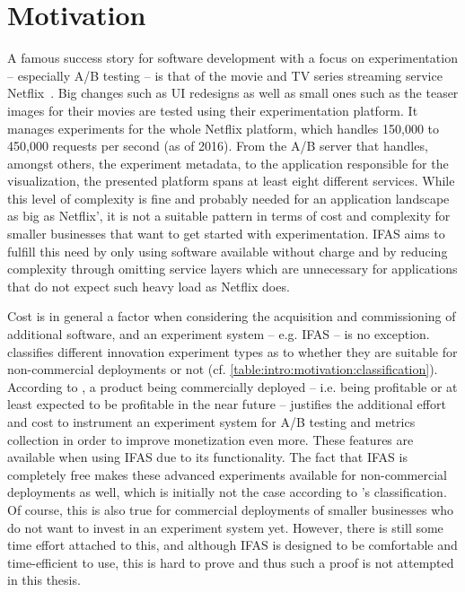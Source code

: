 
\section{Motivation}
\label{sec:intro:motivation}

A famous success story for software development with a focus on experimentation -- especially A/B testing -- is that of the movie and TV series streaming service Netflix~\cite{WEB:Netflix:2016}.
Big changes such as UI redesigns as well as small ones such as the teaser images for their movies are tested using their experimentation platform.
It manages experiments for the whole Netflix platform, which handles 150,000 to 450,000 requests per second (as of 2016).
From the A/B server that handles, amongst others, the experiment metadata, to the application responsible for the visualization, the presented platform spans at least eight different services.
While this level of complexity is fine and probably needed for an application landscape as big as Netflix', it is not a suitable pattern in terms of cost and complexity for smaller businesses that want to get started with experimentation.
\ac{IFAS} aims to fulfill this need by only using software available without charge and by reducing complexity through omitting service layers which are unnecessary for applications that do not expect such heavy load as Netflix does.

Cost is in general a factor when considering the acquisition and commissioning of additional software, and an experiment system -- e.g. \ac{IFAS} -- is no exception.
\citet{Bosch2012} classifies different innovation experiment types as to whether they are suitable for non-commercial deployments or not (cf. \cref{table:intro:motivation:classification}).
According to \citeauthor{Bosch2012}, a product being commercially deployed -- i.e. being profitable or at least expected to be profitable in the near future -- justifies the additional effort and cost to instrument an experiment system for A/B testing and metrics collection in order to improve monetization even more.
These features are available when using \ac{IFAS} due to its functionality.
The fact that \ac{IFAS} is completely free makes these advanced experiments available for non-commercial deployments as well, which is initially not the case according to \citeauthor{Bosch2012}'s classification.
Of course, this is also true for commercial deployments of smaller businesses who do not want to invest in an experiment system yet.
However, there is still some time effort attached to this, and although \ac{IFAS} is designed to be comfortable and time-efficient to use, this is hard to prove and thus such a proof is not attempted in this thesis.

